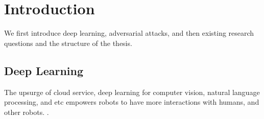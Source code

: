 \chapter{Introduction}
\label{chpt:intro}

We first introduce deep learning, adversarial attacks, and then existing research questions and the structure of the thesis.



\section{Deep Learning}
\label{sec:deep_learning}

The upsurge of cloud service, deep learning for computer vision, natural language processing,  and etc empowers robots to have more interactions with humans, and other robots. \citep{wang2018current}.

